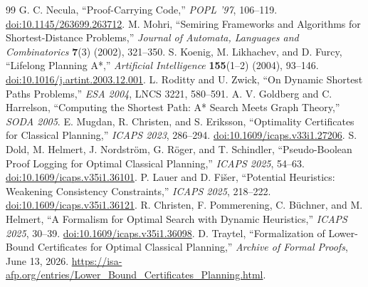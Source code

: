 \documentclass[11pt,letterpaper]{article}
\theoremstyle{definition}
\theoremstyle{remark}
\begin{document}
\begin{thebibliography}{99}
 G. C. Necula, ``Proof-Carrying Code,'' \emph{POPL '97}, 106--119. \href{https://doi.org/10.1145/263699.263712}{doi:10.1145/263699.263712}.
 M. Mohri, ``Semiring Frameworks and Algorithms for Shortest-Distance Problems,'' \emph{Journal of Automata, Languages and Combinatorics} \textbf{7}(3) (2002), 321--350.
 S. Koenig, M. Likhachev, and D. Furcy, ``Lifelong Planning A*,'' \emph{Artificial Intelligence} \textbf{155}(1--2) (2004), 93--146. \href{https://doi.org/10.1016/j.artint.2003.12.001}{doi:10.1016/j.artint.2003.12.001}.
 L. Roditty and U. Zwick, ``On Dynamic Shortest Paths Problems,'' \emph{ESA 2004}, LNCS 3221, 580--591.
 A. V. Goldberg and C. Harrelson, ``Computing the Shortest Path: A* Search Meets Graph Theory,'' \emph{SODA 2005}.
 E. Mugdan, R. Christen, and S. Eriksson, ``Optimality Certificates for Classical Planning,'' \emph{ICAPS 2023}, 286--294. \href{https://doi.org/10.1609/icaps.v33i1.27206}{doi:10.1609/icaps.v33i1.27206}.
 S. Dold, M. Helmert, J. Nordstr\"om, G. R\"oger, and T. Schindler, ``Pseudo-Boolean Proof Logging for Optimal Classical Planning,'' \emph{ICAPS 2025}, 54--63. \href{https://doi.org/10.1609/icaps.v35i1.36101}{doi:10.1609/icaps.v35i1.36101}.
 P. Lauer and D. Fi\v{s}er, ``Potential Heuristics: Weakening Consistency Constraints,'' \emph{ICAPS 2025}, 218--222. \href{https://doi.org/10.1609/icaps.v35i1.36121}{doi:10.1609/icaps.v35i1.36121}.
 R. Christen, F. Pommerening, C. B\"uchner, and M. Helmert, ``A Formalism for Optimal Search with Dynamic Heuristics,'' \emph{ICAPS 2025}, 30--39. \href{https://doi.org/10.1609/icaps.v35i1.36098}{doi:10.1609/icaps.v35i1.36098}.
 D. Traytel, ``Formalization of Lower-Bound Certificates for Optimal Classical Planning,'' \emph{Archive of Formal Proofs}, June 13, 2026. \url{https://isa-afp.org/entries/Lower_Bound_Certificates_Planning.html}.
\end{thebibliography}

\clearpage
\thispagestyle{plain}
\end{document}
